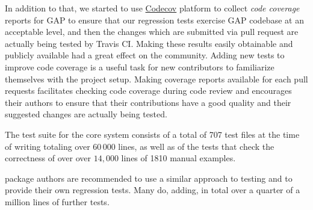 \documentclass{deliverablereport}
\renewcommand{\comment}[1]{\TODO{Comment: #1}}
\begin{document}
In addition to that, we started to use \href{https://codecov.io/}{Codecov}
platform to collect \emph{code coverage} reports for GAP to ensure that our
regression tests exercise GAP codebase at an acceptable level, and then
the changes which are submitted via pull request are actually being tested
by Travis CI. Making these results easily obtainable and publicly available
had a great effect on the community. Adding new tests to improve code coverage
is a useful task for new contributors to familiarize themselves with the
project setup. Making coverage reports available for each pull requests
facilitates checking code coverage during code review and
encourages their authors to ensure that their contributions have a good
quality and their suggested changes are actually being tested. 

The \GAP test
suite for the core system consists of a total of 707 test files at the time of writing
totaling over $60\,000$ lines,
as well as of the tests that check the correctness of over
over $14,000$ lines of 1810 manual examples.
%

\GAP package authors are recommended to 
use a similar approach to testing and to provide their own regression
tests. Many do, adding, in total over a quarter of a million lines of
further tests.
\end{document}
